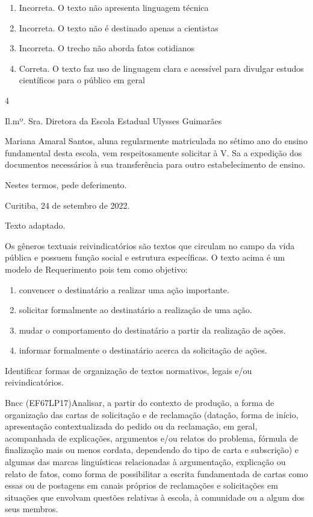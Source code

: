 {{\begin{escolha}
{\begin{itemize}
\begin{itemize}
\begin{enumerate}
\def\labelenumi{\arabic{enumi}.}
\item
  Incorreta. O texto não apresenta linguagem técnica
\item
  Incorreta. O texto não é destinado apenas a cientistas
\item
  Incorreta. O trecho não aborda fatos cotidianos
\item
  Correta. O texto faz uso de linguagem clara e acessível para divulgar
  estudos científicos para o público em geral
\end{enumerate}

\num{4}

Il.mº. Sra. Diretora da Escola Estadual Ulysses Guimarães

Mariana Amaral Santos, aluna regularmente matriculada no sétimo ano do
ensino fundamental desta escola, vem respeitosamente solicitar à V. Sa a
expedição dos documentos necessários à sua transferência para outro
estabelecimento de ensino.

Nestes termos, pede deferimento.

Curitiba, 24 de setembro de 2022.

Texto adaptado.

Os gêneros textuais reivindicatórios são textos que circulam no campo da
vida pública e possuem função social e estrutura específicas. O texto
acima é um modelo de Requerimento pois tem como objetivo:

\begin{enumerate}
\def\labelenumi{\arabic{enumi}.}
\item
  convencer o destinatário a realizar uma ação importante.
\item
  solicitar formalmente ao destinatário a realização de uma ação.
\item
  mudar o comportamento do destinatário a partir da realização de ações.
\item
  informar formalmente o destinatário acerca da solicitação de ações.
\end{enumerate}

Identificar formas de organização de textos normativos, legais e/ou
reivindicatórios.

Bncc (EF67LP17)Analisar, a partir do contexto de produção, a forma de
organização das cartas de solicitação e de reclamação (datação, forma de
início, apresentação contextualizada do pedido ou da reclamação, em
geral, acompanhada de explicações, argumentos e/ou relatos do problema,
fórmula de finalização mais ou menos cordata, dependendo do tipo de
carta e subscrição) e algumas das marcas linguísticas relacionadas à
argumentação, explicação ou relato de fatos, como forma de possibilitar
a escrita fundamentada de cartas como essas ou de postagens em canais
próprios de reclamações e solicitações em situações que envolvam
questões relativas à escola, à comunidade ou a algum dos seus membros.


\end{itemize}
\end{itemize}}
\end{escolha}}}
